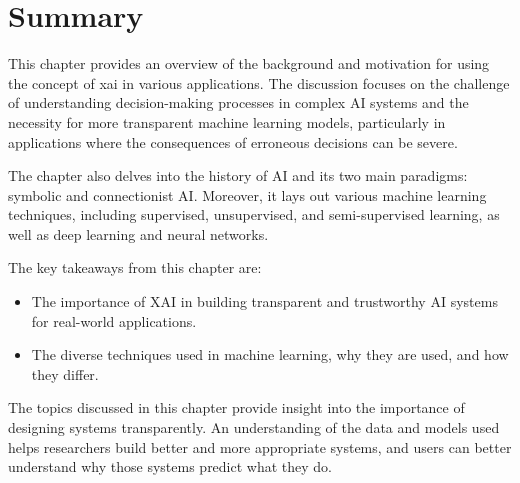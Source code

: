 \section{Summary}
\label{sec:2_summary}

\begin{comment}
SUMMARY: Often, we recommend ending this chapter (and all chapters after except the conclusion) with a summary section. The aim is to give an overview of, and tea-spoon-feeding the reader with, what he/she should have learned reading this chapter. What can be concluded from this chapter? 
How does the information given here give arguments for your problem statement? Finally, lead to the next chapter (“... and we will therefore in the next chapter address these challenges, and describe our ideas/implementation/...”)
\end{comment}


This chapter provides an overview of the background and motivation for using the concept of \gls{xai} in various applications. 
The discussion focuses on the challenge of understanding decision-making processes in complex AI systems and the necessity for more transparent machine learning models, particularly in applications where the consequences of erroneous decisions can be severe. 


The chapter also delves into the history of AI and its two main paradigms: symbolic and connectionist AI. 
Moreover, it lays out various machine learning techniques, including supervised, unsupervised, and semi-supervised learning, as well as deep learning and neural networks.


The key takeaways from this chapter are:

\begin{itemize}
    \item The importance of XAI in building transparent and trustworthy AI systems for real-world applications.
    \item The diverse techniques used in machine learning, why they are used, and how they differ.
\end{itemize}

The topics discussed in this chapter provide insight into the importance of designing systems transparently. An understanding of the data and models used helps researchers build better and more appropriate systems, and users can better understand why those systems predict what they do.

\begin{comment}
    How does the information given here give arguments for your problem statement?
\end{comment}

